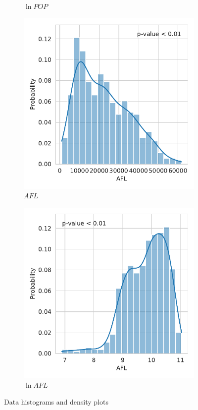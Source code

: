 \documentclass[12pt,a4paper]{article}
\begin{document}
\begin{figure}[htbp]
\begin{subfigure}{0.45\textwidth}
\caption{$\ln POP$}
\end{subfigure}
\begin{subfigure}{0.45\textwidth}
\includegraphics[width=\textwidth]{./plots/dis/distplot_AFL.pdf}
\caption{$AFL$}
\end{subfigure}
\begin{subfigure}{0.45\textwidth}
\includegraphics[width=\textwidth]{./plots/dis/distplot_lnAFL.pdf}
\caption{$\ln AFL$}
\end{subfigure}
\caption{Data histograms and density plots}
\label{fig:data_dists}
\end{figure}
\end{document}
